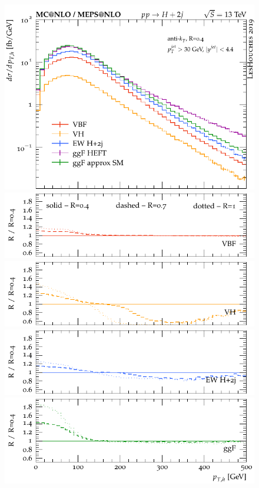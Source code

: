 \documentclass[10pt,prd,fleqn,superscriptaddress,notitlepage,nofootinbib,preprintnumbers,nobalancelastpage]{revtex4-1}
\begin{document}
\begin{figure}[p]
\centering
  \begin{minipage}{.295\textwidth}
    \includegraphics[width=\textwidth]{figures/channels/pth.pdf}
    \includegraphics[width=\textwidth]{figures/channels/pth_rVBF.pdf}
    \includegraphics[width=\textwidth]{figures/channels/pth_rVH.pdf}
    \includegraphics[width=\textwidth]{figures/channels/pth_rHJJ.pdf}
    \includegraphics[width=\textwidth]{figures/channels/pth_rGGH.pdf}

\end{minipage}
\end{figure}
\end{document}
